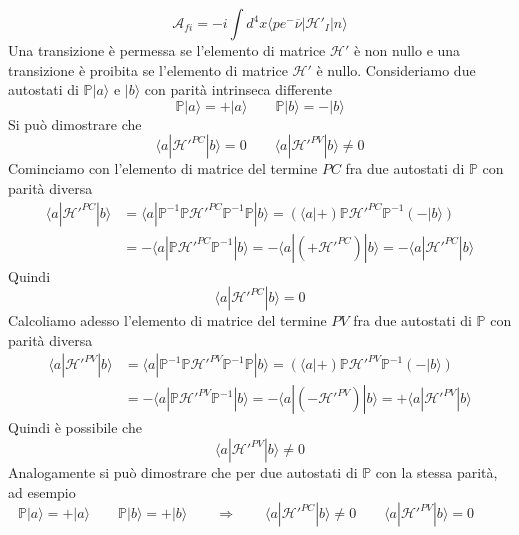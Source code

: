 $$
\mathcal{A}_{fi} = -i \int d^4x \langle p e^- \overline{\nu} | \mathcal{H}'_I | n \rangle
$$
Una transizione è permessa se l'elemento di matrice $\mathcal{H}'$ è non nullo e una transizione è proibita se l'elemento di matrice $\mathcal{H}'$ è nullo. Consideriamo due autostati di $\mathbb{P} |a\rangle$ e $|b\rangle$ con parità intrinseca differente
$$
\mathbb{P}|a\rangle = +|a\rangle \qquad \mathbb{P}|b\rangle = -|b\rangle
$$
Si può dimostrare che
$$
\langle a | \mathcal{H}'^{PC} | b \rangle = 0 \qquad \langle a | \mathcal{H}'^{PV} | b \rangle \neq 0
$$
Cominciamo con l'elemento di matrice del termine $PC$ fra due autostati di $\mathbb{P}$ con parità diversa
$$
\begin{aligned}
	\langle a | \mathcal{H}'^{PC} | b \rangle &= \langle a | \mathbb{P}^{-1} \mathbb{P} \mathcal{H}'^{PC} \mathbb{P}^{-1} \mathbb{P} | b \rangle = (\langle a | +) \mathbb{P} \mathcal{H}'^{PC} \mathbb{P}^{-1} (- | b \rangle) \\
	&= - \langle a | \mathbb{P} \mathcal{H}'^{PC} \mathbb{P}^{-1} | b \rangle = - \langle a | (+ \mathcal{H}'^{PC}) | b \rangle = - \langle a | \mathcal{H}'^{PC} | b \rangle
\end{aligned}
$$
Quindi
$$
\langle a | \mathcal{H}'^{PC} | b \rangle = 0
$$
Calcoliamo adesso l'elemento di matrice del termine $PV$ fra due autostati di $\mathbb{P}$ con parità diversa
$$
\begin{aligned}
	\langle a | \mathcal{H}'^{PV} | b \rangle &= \langle a | \mathbb{P}^{-1} \mathbb{P} \mathcal{H}'^{PV} \mathbb{P}^{-1} \mathbb{P} | b \rangle = (\langle a | +) \mathbb{P} \mathcal{H}'^{PV} \mathbb{P}^{-1} (- | b \rangle) \\
	&= - \langle a | \mathbb{P} \mathcal{H}'^{PV} \mathbb{P}^{-1} | b \rangle = - \langle a | (- \mathcal{H}'^{PV}) | b \rangle = + \langle a | \mathcal{H}'^{PV} | b \rangle
\end{aligned}
$$
Quindi è possibile che
$$
\langle a | \mathcal{H}'^{PV} | b \rangle \neq 0
$$
Analogamente si può dimostrare che per due autostati di $\mathbb{P}$ con la stessa parità, ad esempio
$$
\mathbb{P}|a\rangle = +|a\rangle \qquad \mathbb{P}|b\rangle = +|b\rangle \qquad \Longrightarrow \qquad \langle a | \mathcal{H}'^{PC} | b \rangle \neq 0 \qquad \langle a | \mathcal{H}'^{PV} | b \rangle = 0 \qquad 
$$
